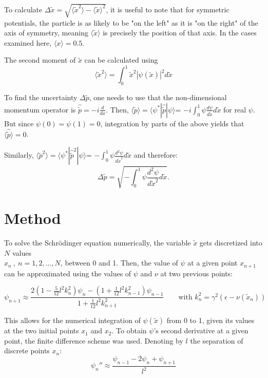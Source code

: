\documentclass[11pt]{article}
\begin{document}
To calculate $\Delta \tilde{x}=\sqrt{\langle \tilde{x}^2\rangle-\langle\tilde{x}\rangle^2}$,
it is useful to note that for symmetric potentials, the particle is as likely to be 
"on the left" as it is "on the right" of the axis of symmetry, meaning $\langle \tilde{x}\rangle$
is precisely the position of that axis. In the cases examined here, $\langle x \rangle=0.5$.

The second moment of $\tilde{x}$ can be calculated using
\begin{equation}
  \langle\tilde{x}^2\rangle=\int_0^1 \tilde{x}^2|\psi(\tilde{x})|^2d\tilde{x}
\end{equation}

To find the uncertainty $\Delta \tilde{p}$, one needs to use that the 
non-dimensional momentum operator is $\hat{\tilde{p}}=-i\frac{d}{dx}$.
Then, $\langle \tilde{p}\rangle=\langle\psi^*|\hat{\tilde{p}}|\psi\rangle$=
$-i\int_0^1\psi\frac{d\psi}{d\tilde{x}}d\tilde{x}$ for real $\psi$. But since
$\psi(0)=\psi(1)=0$, integration by parts of the above yields that
$\langle\hat{\tilde{p}}\rangle=0$.

Similarly, $\langle \tilde{p}^2\rangle=\langle\psi^*|\hat{\tilde{p}}^2|\psi\rangle$=
$-\int_0^1\psi\frac{d^2\psi}{d\tilde{x}^2}d\tilde{x}$ and therefore:
\begin{equation}
  \Delta\tilde{p}=\sqrt{-\int_0^1\psi\frac{d^2\psi}{d\tilde{x}^2}d\tilde{x}}.
\end{equation}

\section{Method}

To solve the Schr{\"o}dinger equation numerically, the variable $\tilde{x}$ gets
discretized into $N$ values\\
 $x_n\ ,\ n=1,2,...,N$, between 0 and 1. Then, 
the value of $\psi$ at a given point $x_{n+1}$ can be approximated using the
values of $\psi$ and $\nu$ at two previous points:

\begin{equation} 
  \label{eq:4}
  \psi_{n+1}\approx\frac{2(1-\frac{5}{12}l^2k_n^2)\psi_n-(1+\frac{1}{12}l^2k^2_{n-1})\psi_{n-1}}{1+\frac{1}{12}l^2k^2_{n+1}}
  \qquad\text{with }k_n^2=\gamma^2(\epsilon-\nu(\tilde{x}_n))
\end{equation}

This allows for the numerical integration of $\psi(\tilde{x})$ from 0 to 1,
 given its values at the two
initial points $x_1$ and $x_2$.
To obtain $\psi$'s second derivative at a given point, the finite difference
scheme was used. Denoting by $l$ the separation of discrete points $x_n$:
\begin{equation}
  \psi_n''\approx\frac{\psi_{n-1}-2\psi_n+\psi_{n+1}}{l^2}
\end{equation}
\end{document}
